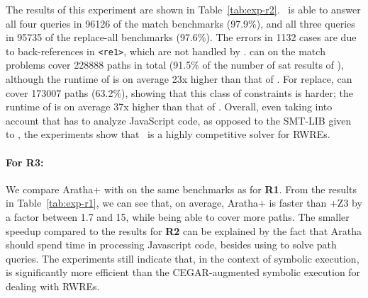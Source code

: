 The results of this experiment are shown in
Table~\ref{tab:exp-r2}. \ostrich\ is able to answer all four queries
in 96126 of the match benchmarks (97.9\%), and all three queries in
95735 of the replace-all benchmarks (97.6\%). The errors in 1132 cases
are due to back-references in \verb!<re1>!, which are not handled by
\ostrich. \expose{} can on the match problems cover 228888 paths in
total (91.5\% of the number of sat results of \ostrich), although the
runtime of \expose{} is on average 23x higher than that of
\ostrich. For replace, \expose{} can cover 173007 paths (63.2\%),
showing that this class of constraints is harder; the runtime of
\expose{} is on average 37x higher than that of \ostrich.  Overall,
even taking into account that \expose{} has to analyze JavaScript
code, as opposed to the SMT-LIB given to \ostrich, the experiments
show that \ostrich\ is a highly competitive solver for RWREs.

\vspace{-2mm}

\paragraph{For \textbf{R3}:} We compare Aratha+{\ostrich} with \expose{}
on the same benchmarks as for \textbf{R1}.  From the results in
Table~\ref{tab:exp-r1}, we can see that, on average, Aratha+{\ostrich}
is faster than \expose{}+Z3 by a factor between 1.7 and 15, while being
able to cover more paths. The smaller speedup compared to the results
for \textbf{R2} can be explained by the fact that Aratha should spend time in processing Javascript code, besides using {\ostrich} to solve path queries.
The experiments still indicate that,
in the context of symbolic execution, {\ostrich} is significantly more
efficient than the CEGAR-augmented symbolic execution for dealing
with RWREs.
